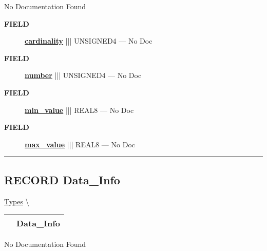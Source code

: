 No Documentation Found







\par
\begin{description}
\item [\colorbox{tagtype}{\color{white} \textbf{\textsf{FIELD}}}] \textbf{\underline{cardinality}} ||| UNSIGNED4 --- No Doc
\item [\colorbox{tagtype}{\color{white} \textbf{\textsf{FIELD}}}] \textbf{\underline{number}} ||| UNSIGNED4 --- No Doc
\item [\colorbox{tagtype}{\color{white} \textbf{\textsf{FIELD}}}] \textbf{\underline{min\_value}} ||| REAL8 --- No Doc
\item [\colorbox{tagtype}{\color{white} \textbf{\textsf{FIELD}}}] \textbf{\underline{max\_value}} ||| REAL8 --- No Doc
\end{description}





\rule{\linewidth}{0.5pt}
\subsection*{\textsf{\colorbox{headtoc}{\color{white} RECORD}
Data\_Info}}

\hypertarget{ecldoc:logisticregression.types.data_info}{}
\hspace{0pt} \hyperlink{ecldoc:LogisticRegression.Types}{Types} \textbackslash 

{\renewcommand{\arraystretch}{1.5}
\begin{tabularx}{\textwidth}{|>{\raggedright\arraybackslash}l|X|}
\hline
\hspace{0pt}\mytexttt{\color{red} } & \textbf{Data\_Info} \\
\hline
\end{tabularx}
}

\par





No Documentation Found







